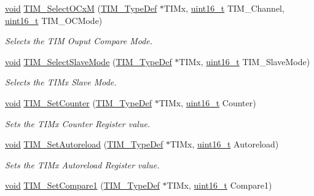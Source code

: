 \begin{DoxyCompactItemize}
\hyperlink{group___n_a_m_e_ga18028b8badbf1ea7e704ccac3c488e82}{void} \hyperlink{group___t_i_m___exported___functions_ga83ea0af5a7c1af521236ce5e4d2c42b0}{T\-I\-M\-\_\-\-Select\-O\-Cx\-M} (\hyperlink{struct_t_i_m___type_def}{T\-I\-M\-\_\-\-Type\-Def} $\ast$T\-I\-Mx, \hyperlink{stdint_8h_a273cf69d639a59973b6019625df33e30}{uint16\-\_\-t} T\-I\-M\-\_\-\-Channel, \hyperlink{stdint_8h_a273cf69d639a59973b6019625df33e30}{uint16\-\_\-t} T\-I\-M\-\_\-\-O\-C\-Mode)
\begin{DoxyCompactList}\small\item\em Selects the T\-I\-M Ouput Compare Mode. \end{DoxyCompactList}\item 
\hyperlink{group___n_a_m_e_ga18028b8badbf1ea7e704ccac3c488e82}{void} \hyperlink{group___t_i_m___exported___functions_ga2f19ce1d90990691cf037e419ba08003}{T\-I\-M\-\_\-\-Select\-Slave\-Mode} (\hyperlink{struct_t_i_m___type_def}{T\-I\-M\-\_\-\-Type\-Def} $\ast$T\-I\-Mx, \hyperlink{stdint_8h_a273cf69d639a59973b6019625df33e30}{uint16\-\_\-t} T\-I\-M\-\_\-\-Slave\-Mode)
\begin{DoxyCompactList}\small\item\em Selects the T\-I\-Mx Slave Mode. \end{DoxyCompactList}\item 
\hyperlink{group___n_a_m_e_ga18028b8badbf1ea7e704ccac3c488e82}{void} \hyperlink{group___t_i_m___exported___functions_gaad2c31dc9c551b48f08b96ba49c4aa44}{T\-I\-M\-\_\-\-Set\-Counter} (\hyperlink{struct_t_i_m___type_def}{T\-I\-M\-\_\-\-Type\-Def} $\ast$T\-I\-Mx, \hyperlink{stdint_8h_a273cf69d639a59973b6019625df33e30}{uint16\-\_\-t} Counter)
\begin{DoxyCompactList}\small\item\em Sets the T\-I\-Mx Counter Register value. \end{DoxyCompactList}\item 
\hyperlink{group___n_a_m_e_ga18028b8badbf1ea7e704ccac3c488e82}{void} \hyperlink{group___t_i_m___exported___functions_ga7880e4c00002d6421f9059a2ed841d5c}{T\-I\-M\-\_\-\-Set\-Autoreload} (\hyperlink{struct_t_i_m___type_def}{T\-I\-M\-\_\-\-Type\-Def} $\ast$T\-I\-Mx, \hyperlink{stdint_8h_a273cf69d639a59973b6019625df33e30}{uint16\-\_\-t} Autoreload)
\begin{DoxyCompactList}\small\item\em Sets the T\-I\-Mx Autoreload Register value. \end{DoxyCompactList}\item 
\hyperlink{group___n_a_m_e_ga18028b8badbf1ea7e704ccac3c488e82}{void} \hyperlink{group___t_i_m___exported___functions_gab3a6031f187cb8af62eb09a67b4fd2ad}{T\-I\-M\-\_\-\-Set\-Compare1} (\hyperlink{struct_t_i_m___type_def}{T\-I\-M\-\_\-\-Type\-Def} $\ast$T\-I\-Mx, \hyperlink{stdint_8h_a273cf69d639a59973b6019625df33e30}{uint16\-\_\-t} Compare1)

\end{DoxyCompactItemize}
